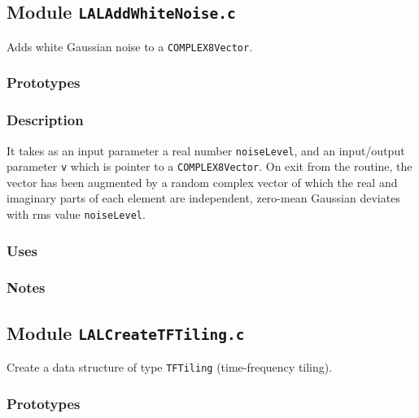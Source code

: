 \newpage
\subsection{Module \texttt{LALAddWhiteNoise.c}}
\label{ss:LALAddWhiteNoise.c}

Adds white Gaussian noise to a \verb+COMPLEX8Vector+.  

\subsubsection*{Prototypes}
\vspace{0.1in}


\subsubsection*{Description}
It takes as an input parameter a real number \verb+noiseLevel+, and an
input/output parameter \verb+v+ which is pointer to a \verb+COMPLEX8Vector+.
On exit from the routine, the vector has been augmented by a random complex
vector of which the real and imaginary parts of each element are independent,
zero-mean Gaussian deviates with rms value \verb+noiseLevel+.

\subsubsection*{Uses}

\subsubsection*{Notes}

\vfill{\footnotesize}

\newpage
\subsection{Module \texttt{LALCreateTFTiling.c}}
\label{ss:LALCreateTFTiling.c}

Create a data structure of type \verb+TFTiling+ (time-frequency tiling).

\subsubsection*{Prototypes}
\vspace{0.1in}


